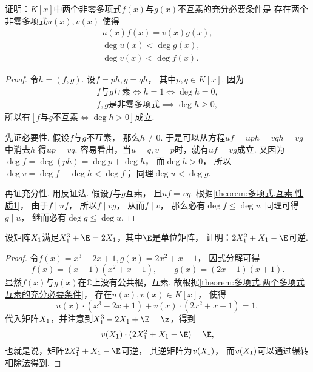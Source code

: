\begin{example}
证明：\(K[x]\)中两个非零多项式\(f(x)\)与\(g(x)\)不互素的充分必要条件是
存在两个非零多项式\(u(x),v(x)\)
使得\begin{gather*}
	u(x) f(x) = v(x) g(x), \\
	\deg u(x) < \deg g(x), \\
	\deg v(x) < \deg f(x).
\end{gather*}
\begin{proof}
令\(h=(f,g)\).
设\(f = ph,
g = qh\)，
其中\(p,q \in K[x]\).
因为\begin{gather*}
	\text{$f$与$g$互素}
	\iff
	h=1
	\iff
	\deg h=0, \\
	\text{$f,g$是非零多项式}
	\implies
	\deg h\geq0,
\end{gather*}
所以有\([\text{$f$与$g$不互素}
\iff
\deg h>0]\)成立.

先证必要性.
假设\(f\)与\(g\)不互素，
那么\(h\neq0\).
于是可以从方程\(
	uf
	= uph
	= vqh
	= vg
\)中消去\(h\)
得\(up=vq\).
容易看出，当\(u=q,v=p\)时，就有\(uf=vg\)成立.
又因为\(\deg f=\deg(ph)=\deg p+\deg h\)，
而\(\deg h>0\)，
所以\(\deg v=\deg f-\deg h<\deg f\)；
同理\(\deg u<\deg g\).

再证充分性.
用反证法.
假设\(f\)与\(g\)互素，
且\(uf=vg\).
根据\cref{theorem:多项式.互素.性质1}，
由于\(f \mid uf\)，
所以\(f \mid vg\)，
从而\(f \mid v\)，
那么必有\(\deg f \leq \deg v\).
同理可得\(g \mid u\)，
继而必有\(\deg g \leq \deg u\).
\end{proof}
\end{example}

\begin{example}
设矩阵\(X_1\)满足\(\A^3+\E=2\A\)，其中\(\E\)是单位矩阵，
证明：\(2\A^2+\A-\E\)可逆.
\begin{proof}
令\(f(x)=x^3-2x+1,
g(x)=2x^2+x-1\)，
因式分解可得\[
	f(x) = (x-1)(x^2+x-1),
	\qquad
	g(x) = (2x-1)(x+1).
\]
显然\(f(x)\)与\(g(x)\)在\(\mathbb{C}\)上没有公共根，互素.
故根据\cref{theorem:多项式.两个多项式互素的充分必要条件}，
存在\(u(x),v(x) \in K[x]\)，
使得\[
	u(x) \cdot (x^3-2x+1) + v(x) \cdot (2x^2+x-1) = 1,
\]
代入矩阵\(X_1\)，并注意到\(\A^3-2\A+\E=\z\)，得到\[
	v(\A) \cdot (2\A^2+\A-\E) = \E,
\]
也就是说，矩阵\(2\A^2+\A-\E\)可逆，
其逆矩阵为\(v(X_1)\)，
而\(v(X_1)\)可以通过辗转相除法得到.
\end{proof}
\end{example}

